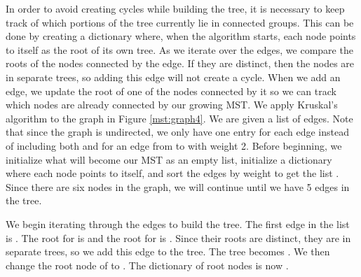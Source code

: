 In order to avoid creating cycles while building the tree, it is necessary to keep track of which portions of the tree currently lie in connected groups.
This can be done by creating a dictionary where, when the algorithm starts, each node points to itself as the root of its own tree.
As we iterate over the edges, we compare the roots of the nodes connected by the edge. If they are distinct, then the nodes are in separate trees, so adding this edge will not create a cycle. When we add an edge, we update the root of one of the nodes connected by it so we can track which nodes are already connected by our growing MST.
We apply Kruskal's algorithm to the graph in Figure \ref{mst:graph4}. We are given a list of edges. Note that since the graph is undirected, we only have one entry for each edge instead of including both  and  for an edge from  to  with weight 2. Before beginning, we initialize what will become our MST as an empty list, initialize a dictionary  where each node points to itself, and sort the edges by weight to get the list \li{[(C, D, 1), (C, E, 1), (D, E, 2), (A, B, 3), (B, F, 4), (E, F, 4), (B, C, 5), (C, F, 5), (A, F, 6)]}. Since there are six nodes in the graph, we will continue until we have 5 edges in the tree.

\vspace{.25cm}

\begin{minipage}{0.35\textwidth}
\end{minipage}\hfill
\begin{minipage}{0.55\textwidth}
We begin iterating through the edges to build the tree.
The first edge in the list is .
The root for  is  and the root for  is . Since their roots are distinct, they are in separate trees, so we add this edge to the tree. The tree becomes \li{[(C, D, 1)]}.
We then change the root node of  to .
The dictionary of root nodes is now .
\end{minipage}

